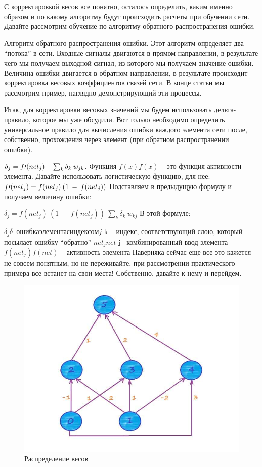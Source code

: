 \documentclass[12pt,a4paper]{report}
\begin{document}
С корректировкой весов все понятно, осталось определить, каким именно образом и по какому алгоритму будут происходить расчеты при обучении сети. Давайте рассмотрим обучение по алгоритму обратного распространения ошибки.

Алгоритм обратного распространения ошибки.
Этот алгоритм определяет два “потока” в сети. Входные сигналы двигаются в прямом направлении, в результате чего мы получаем выходной сигнал, из которого мы получаем значение ошибки. Величина ошибки двигается в обратном направлении, в результате происходит корректировка весовых коэффициентов связей сети. В конце статьи мы рассмотрим пример, наглядно демонстрирующий эти процессы.

Итак, для корректировки весовых значений мы будем использовать дельта-правило, которое мы уже обсудили. Вот только необходимо определить универсальное правило для вычисления ошибки каждого элемента сети после, собственно, прохождения через элемент (при обратном распространении ошибки).

$\delta_j = f{\Large{\prime}}(net_j)\medspace\cdot\medspace \sum_{k}{}{\delta_k\medspace w_{jk}}$. Функция $f(x)f(x)$ – это функция активности элемента. Давайте использовать логистическую функцию, для нее:
$f{\Large{\prime}}(net_j) = f(net_j)\medspace (1\medspace-\medspace f(net_j))$
Подставляем в предыдущую формулу и получаем величину ошибки:

$\delta_j = f(net_j)\medspace (1\medspace-\medspace f(net_j))\medspace \sum_{k}{}{\delta_k\medspace w_{kj}}$
В этой формуле:

$\delta_jδ  – ошибка элемента с индексом j$
k – индекс, соответствующий слою, который посылает ошибку “обратно”
$net_jnet$ 
j– комбинированный ввод элемента
$f(net_j)f(net)$ – активность элемента
Наверняка сейчас еще все это кажется не совсем понятным, но не переживайте, при рассмотрении практического примера все встанет на свои места! Собственно, давайте к нему и перейдем.

\begin{figure}
	\centering
	\includegraphics[width=\columnwidth]{weight}
	\caption{Распределение весов}
	\end{figure}
\end{document}
